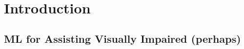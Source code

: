 
\chapter{Introduction}
\label{chap:introduction}

\section{ML for Assisting Visually Impaired (perhaps)}







